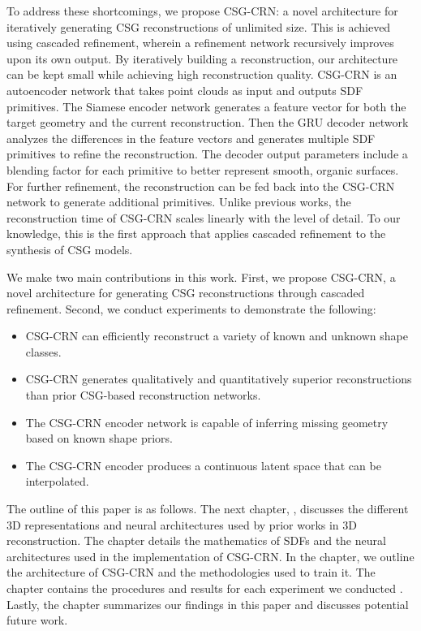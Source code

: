To address these shortcomings, we propose CSG-CRN: a novel architecture for iteratively generating CSG reconstructions of unlimited size. This is achieved using cascaded refinement, wherein a refinement network recursively improves upon its own output. By iteratively building a reconstruction, our architecture can be kept small while achieving high reconstruction quality. CSG-CRN is an autoencoder network that takes point clouds as input and outputs SDF primitives. The Siamese encoder network generates a feature vector for both the target geometry and the current reconstruction. Then the GRU decoder network analyzes the differences in the feature vectors and generates multiple SDF primitives to refine the reconstruction. The decoder output parameters include a blending factor for each primitive to better represent smooth, organic surfaces. For further refinement, the reconstruction can be fed back into the CSG-CRN network to generate additional primitives. Unlike previous works, the reconstruction time of CSG-CRN scales linearly with the level of detail. To our knowledge, this is the first approach that applies cascaded refinement to the synthesis of CSG models.

We make two main contributions in this work. First, we propose CSG-CRN, a novel architecture for generating CSG reconstructions through cascaded refinement. Second, we conduct experiments to demonstrate the following:

\begin{itemize}
	\item CSG-CRN can efficiently reconstruct a variety of known and unknown shape classes.
	\item CSG-CRN generates qualitatively and quantitatively superior reconstructions than prior CSG-based reconstruction networks.
	\item The CSG-CRN encoder network is capable of inferring missing geometry based on known shape priors.
	\item The CSG-CRN encoder produces a continuous latent space that can be interpolated.
\end{itemize}

\vspace{1em}

The outline of this paper is as follows. The next chapter, , discusses the different 3D representations and neural architectures used by prior works in 3D reconstruction. The  chapter details the mathematics of SDFs and the neural architectures used in the implementation of CSG-CRN. In the  chapter, we outline the architecture of CSG-CRN and the methodologies used to train it. The  chapter contains the procedures and results for each experiment we conducted . Lastly, the  chapter summarizes our findings in this paper and discusses potential future work.
